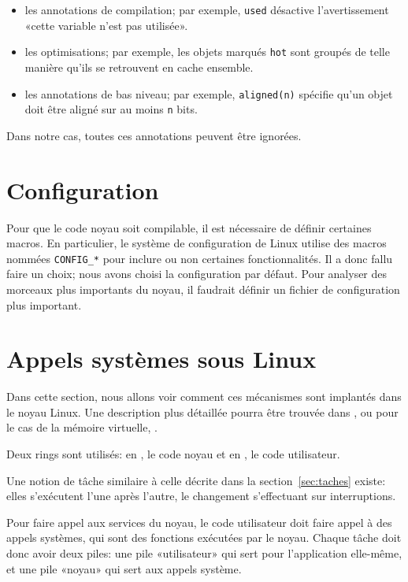 \begin{itemize}
  \item les annotations de compilation; par exemple, \texttt{used} désactive
    l'avertissement «cette variable n'est pas utilisée».

  \item les optimisations; par exemple, les objets marqués \texttt{hot} sont
    groupés de telle manière qu'ils se retrouvent en cache ensemble.

  \item les annotations de bas niveau; par exemple, \verb!aligned(n)!
    spécifie qu'un objet doit être aligné sur au moins \texttt{n} bits.
\end{itemize}

Dans notre cas, toutes ces annotations peuvent être ignorées.

\section{Configuration}

Pour que le code noyau soit compilable, il est nécessaire de définir certaines
macros. En particulier, le système de configuration de Linux utilise des macros
nommées \texttt{CONFIG\_*} pour inclure ou non certaines fonctionnalités. Il a
donc fallu faire un choix; nous avons choisi la configuration par défaut. Pour
analyser des morceaux plus importants du noyau, il faudrait définir un fichier
de configuration plus important.

\section{Appels systèmes sous Linux}
\label{sec:linux-sys}

Dans cette section, nous allons voir comment ces mécanismes sont implantés dans
le noyau Linux. Une description plus détaillée pourra être trouvée dans
\cite{UnderstandingTheLinuxKernel}, ou pour le cas de la mémoire virtuelle,
\cite{LinuxVMM}.

Deux rings sont utilisés: en , le code noyau et en , le code
utilisateur.

Une notion de tâche similaire à celle décrite dans la section~\ref{sec:taches}
existe: elles s'exécutent l'une après l'autre, le changement s'effectuant sur
interruptions.

Pour faire appel aux services du noyau, le code utilisateur doit faire appel à
des appels systèmes, qui sont des fonctions exécutées par le noyau. Chaque tâche
doit donc avoir deux piles: une pile «utilisateur» qui sert pour
l'application elle-même, et une pile «noyau» qui sert aux appels système.

